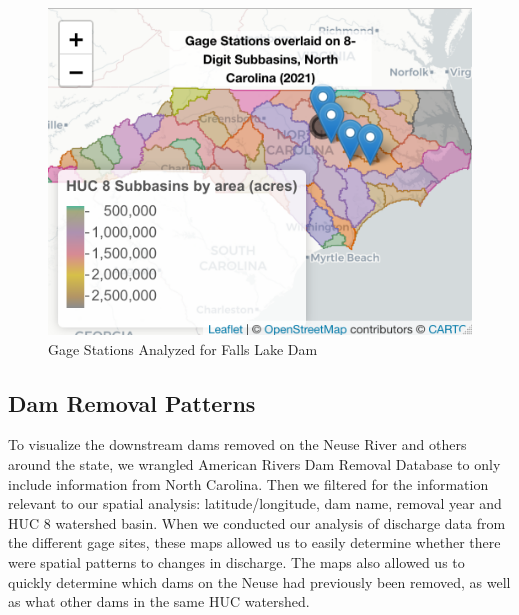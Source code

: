 \documentclass[
  12pt,
]{article}
\begin{document}
\begin{figure}
\centering
\includegraphics{"./Output/gage.station.png"}
\caption{Gage Stations Analyzed for Falls Lake Dam}
\end{figure}

\hypertarget{dam-removal-patterns}{%
\subsection{Dam Removal Patterns}\label{dam-removal-patterns}}

To visualize the downstream dams removed on the Neuse River and others
around the state, we wrangled American Rivers Dam Removal Database to
only include information from North Carolina. Then we filtered for the
information relevant to our spatial analysis: latitude/longitude, dam
name, removal year and HUC 8 watershed basin. When we conducted our
analysis of discharge data from the different gage sites, these maps
allowed us to easily determine whether there were spatial patterns to
changes in discharge. The maps also allowed us to quickly determine
which dams on the Neuse had previously been removed, as well as what
other dams in the same HUC watershed.
\end{document}
